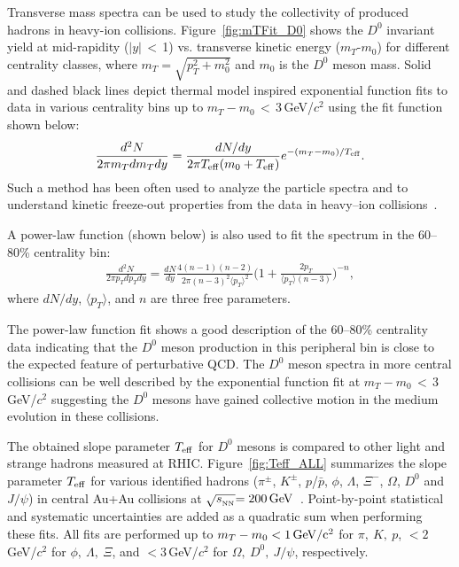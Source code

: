 \documentclass[%
 reprint,	
 amsmath,amssymb,
 aps,
 prc,
]{revtex4-1}
\begin{document}
Transverse mass spectra can be used to study the collectivity of produced hadrons in heavy-ion collisions. Figure~\ref{fig:mTFit_D0} shows the $D^{0}$ invariant yield at mid-rapidity ($|y|$\,$<$\,1) vs. transverse kinetic energy ($m_{T}$-$m_{0}$) for different centrality classes, where $m_{T} = \sqrt{p_{T}^2+m_0^2}$ and $m_0$ is the $D^0$ meson mass. Solid and dashed black lines depict thermal model inspired exponential function fits to data in various centrality bins up to $m_{T}-m_{0}$\,$<$\,3\,GeV/$c^2$ using the fit function shown below:
\begin{equation}
  \begin{aligned}
\frac{d^2N}{2\pi m_{T}dm_{T}dy} = \frac{dN/dy}{2\pi T_{\rm eff}(m_0+T_{\rm eff})}e^{-(m_{T}-m_0)/T_{\rm eff}}.
  \end{aligned}
\label{equ:equation5}
\end{equation}
Such a method has been often used to analyze the particle spectra and to understand kinetic freeze-out properties from the data in heavy--ion collisions~\cite{Kaneta:1999lnf,StarWhitePaper}.


A power-law function (shown below) is also used to fit the spectrum in the 60--80\% centrality bin:
\begin{equation}
  \begin{aligned}
\frac{d^2N}{2\pi p_{T}dp_{T}dy} = \frac{dN}{dy}\frac{4(n-1)(n-2)}{2\pi (n-3)^2\langle p_{T} \rangle ^2}\bigg(1+\frac{2p_{T}}{\langle p_{T} \rangle (n-3)}\bigg)^{-n},
  \end{aligned}
\label{equ:equation6}
\end{equation}
where $dN/dy$, $\langle p_{T}\rangle$, and $n$ are three free parameters.

The power-law function fit shows a good description of the 60--80\% centrality data indicating that the $D^0$ meson production in this peripheral bin is close to the expected feature of perturbative QCD. The $D^0$ meson spectra in more central collisions can be well described by the exponential function fit at $m_{T}-m_{0}$\,$<$\,3\,GeV/$c^2$ suggesting the $D^0$ mesons have gained collective motion in the medium evolution in these collisions.


The obtained slope parameter $T_{\rm eff}$ for $D^0$ mesons is compared to other light and strange hadrons measured at RHIC. 
Figure~\ref{fig:Teff_ALL} summarizes the slope parameter $T_{\rm eff}$ for various identified hadrons ($\pi^{\pm}$, $K^{\pm}$, $p$/$\bar{p}$, $\phi$, $\Lambda$, $\Xi^-$, $\Omega$, $D^0$ and $J/\psi$) in central Au+Au collisions at $\sqrt{s_{_{\rm NN}}} {\rm = 200\,GeV}$~\cite{Adams:2003xp,Abelev:2007rw,Adams:2006ke,Adamczyk:2013tvk}. Point-by-point statistical and systematic uncertainties are added as a quadratic sum when performing these fits. All fits are performed up to $m_{T} - m_{0} <1\,\rm{GeV}/c^2$ for $\pi,\ K,\ p$, $<2$\,GeV/$c^2$ for $\phi,\ \Lambda,\ \Xi$, and $<3$\,GeV/$c^2$ for $\Omega,\ D^{0},\ J/\psi$, respectively. 
\end{document}
